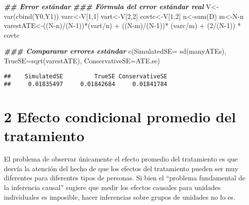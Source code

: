 \documentclass[
]{article}
\newenvironment{Shaded}{\begin{snugshade}}{\end{snugshade}}
\newcommand{\AttributeTok}[1]{\textcolor[rgb]{0.77,0.63,0.00}{#1}}
\newcommand{\DecValTok}[1]{\textcolor[rgb]{0.00,0.00,0.81}{#1}}
\newcommand{\DocumentationTok}[1]{\textcolor[rgb]{0.56,0.35,0.01}{\textbf{\textit{#1}}}}
\newcommand{\FunctionTok}[1]{\textcolor[rgb]{0.00,0.00,0.00}{#1}}
\newcommand{\NormalTok}[1]{#1}
\newcommand{\OtherTok}[1]{\textcolor[rgb]{0.56,0.35,0.01}{#1}}
\newcommand{\SpecialCharTok}[1]{\textcolor[rgb]{0.00,0.00,0.00}{#1}}
\begin{document}
\begin{Shaded}
\begin{Highlighting}[]
\DocumentationTok{\#\# Error estándar}
\DocumentationTok{\#\#\# Fórmula del error estándar real}
\NormalTok{V}\OtherTok{\textless{}{-}}\FunctionTok{var}\NormalTok{(}\FunctionTok{cbind}\NormalTok{(Y0,Y1)) }
\NormalTok{varc}\OtherTok{\textless{}{-}}\NormalTok{V[}\DecValTok{1}\NormalTok{,}\DecValTok{1}\NormalTok{] }
\NormalTok{vart}\OtherTok{\textless{}{-}}\NormalTok{V[}\DecValTok{2}\NormalTok{,}\DecValTok{2}\NormalTok{] }
\NormalTok{covtc}\OtherTok{\textless{}{-}}\NormalTok{V[}\DecValTok{1}\NormalTok{,}\DecValTok{2}\NormalTok{] }
\NormalTok{n}\OtherTok{\textless{}{-}}\FunctionTok{sum}\NormalTok{(D) }
\NormalTok{m}\OtherTok{\textless{}{-}}\NormalTok{N}\SpecialCharTok{{-}}\NormalTok{n }
\NormalTok{varestATE}\OtherTok{\textless{}{-}}\NormalTok{((N}\SpecialCharTok{{-}}\NormalTok{n)}\SpecialCharTok{/}\NormalTok{(N}\DecValTok{{-}1}\NormalTok{))}\SpecialCharTok{*}\NormalTok{(vart}\SpecialCharTok{/}\NormalTok{n) }\SpecialCharTok{+}\NormalTok{ ((N}\SpecialCharTok{{-}}\NormalTok{m)}\SpecialCharTok{/}\NormalTok{(N}\DecValTok{{-}1}\NormalTok{))}\SpecialCharTok{*}\NormalTok{ (varc}\SpecialCharTok{/}\NormalTok{m) }\SpecialCharTok{+}\NormalTok{ (}\DecValTok{2}\SpecialCharTok{/}\NormalTok{(N}\DecValTok{{-}1}\NormalTok{)) }\SpecialCharTok{*}\NormalTok{ covtc }

\DocumentationTok{\#\#\# Compararar errores estándar }
\FunctionTok{c}\NormalTok{(}\AttributeTok{SimulatedSE=} \FunctionTok{sd}\NormalTok{(manyATEs), }\AttributeTok{TrueSE=}\FunctionTok{sqrt}\NormalTok{(varestATE), }\AttributeTok{ConservativeSE=}\NormalTok{ATE.se) }
\end{Highlighting}
\end{Shaded}

\begin{verbatim}
##    SimulatedSE         TrueSE ConservativeSE 
##     0.01835497     0.01842684     0.01841784
\end{verbatim}

\hypertarget{efecto-condicional-promedio-del-tratamiento}{%
\section{2 Efecto condicional promedio del
tratamiento}\label{efecto-condicional-promedio-del-tratamiento}}

El problema de observar únicamente el efecto promedio del tratamiento es
que desvía la atención del hecho de que los efectos del tratamiento
pueden ser muy diferentes para diferentes tipos de personas. Si bien el
``problema fundamental de la inferencia causal'' sugiere que medir los
efectos causales para unidades individuales es imposible, hacer
inferencias sobre grupos de unidades no lo es.
\end{document}
